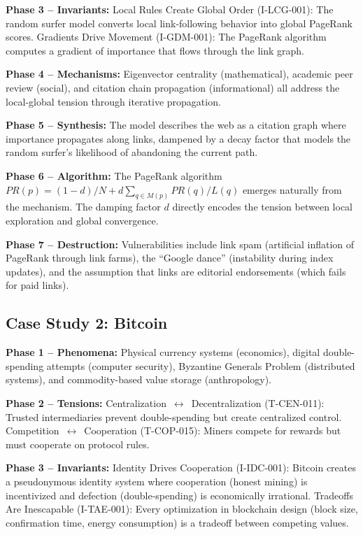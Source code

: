 \documentclass[11pt,a4paper]{article}
\begin{document}
\textbf{Phase 3 -- Invariants:} Local Rules Create Global Order (I-LCG-001): The random surfer model converts local link-following behavior into global PageRank scores. Gradients Drive Movement (I-GDM-001): The PageRank algorithm computes a gradient of importance that flows through the link graph.

\textbf{Phase 4 -- Mechanisms:} Eigenvector centrality (mathematical), academic peer review (social), and citation chain propagation (informational) all address the local-global tension through iterative propagation.

\textbf{Phase 5 -- Synthesis:} The model describes the web as a citation graph where importance propagates along links, dampened by a decay factor that models the random surfer's likelihood of abandoning the current path.

\textbf{Phase 6 -- Algorithm:} The PageRank algorithm $PR(p) = (1-d)/N + d \sum_{q \in M(p)} PR(q)/L(q)$ emerges naturally from the mechanism. The damping factor $d$ directly encodes the tension between local exploration and global convergence.

\textbf{Phase 7 -- Destruction:} Vulnerabilities include link spam (artificial inflation of PageRank through link farms), the ``Google dance'' (instability during index updates), and the assumption that links are editorial endorsements (which fails for paid links).

\subsection{Case Study 2: Bitcoin}

\textbf{Phase 1 -- Phenomena:} Physical currency systems (economics), digital double-spending attempts (computer security), Byzantine Generals Problem (distributed systems), and commodity-based value storage (anthropology).

\textbf{Phase 2 -- Tensions:} Centralization~$\leftrightarrow$~Decentralization (T-CEN-011): Trusted intermediaries prevent double-spending but create centralized control. Competition~$\leftrightarrow$~Cooperation (T-COP-015): Miners compete for rewards but must cooperate on protocol rules.

\textbf{Phase 3 -- Invariants:} Identity Drives Cooperation (I-IDC-001): Bitcoin creates a pseudonymous identity system where cooperation (honest mining) is incentivized and defection (double-spending) is economically irrational. Tradeoffs Are Inescapable (I-TAE-001): Every optimization in blockchain design (block size, confirmation time, energy consumption) is a tradeoff between competing values.
\end{document}

